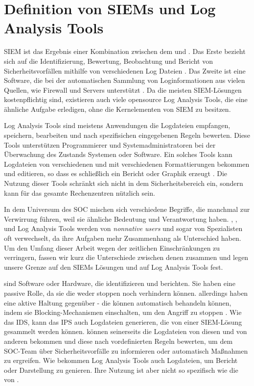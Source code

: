 \section{Definition von SIEMs und Log Analysis Tools}

\gls{SIEM} ist das Ergebnis einer Kombination zwischen dem  und  \citep{Dorigo_SIEM}. Das Erste bezieht sich auf die Identifizierung, Bewertung, Beobachtung und Bericht von Sicherheitsvorfällen mithilfe von verschiedenen Log Dateien \citep{techopedia_SEM}. Das Zweite ist eine Software, die bei der automatischen Sammlung von Loginformationen aus vielen Quellen, wie Firewall und Servers unterstützt \citep{techopedia_SIM}. Da die meisten \gls{SIEM}-Lösungen kostenpflichtig sind, existieren auch viele \gls{opensource} Log Analysis Tools, die eine ähnliche Aufgabe erledigen, ohne die Kernelementen von \gls{SIEM} zu besitzen. 

Log Analysis Tools sind meistens Anwendungen die Logdateien empfangen, speichern, bearbeiten und nach spezifisichen eingegebenen Regeln bewerten. Diese Tools unterstützen Programmierer und Systemadministratoren bei der Überwachung des Zustands Systemen oder Software. Ein solches Tools kann Logdateien von verschiedenen  und mit verschiedenen Formattierungen bekommen und editieren, so dass es schließlich ein Bericht oder Graphik erzeugt \citep{Korzeniowski_LATDef}. Die Nutzung dieser Tools schränkt sich nicht in dem Sicherheitsbereich ein, sondern kann für das gesamte Rechenzentren nützlich sein.


In dem Universum des \gls{SOC} mischen sich verschiedene Begriffe, die manchmal zur Verwirrung führen, weil sie ähnliche Bedeutung und Verantwortung haben. , ,  und Log Analysis Tools werden von \textit{nonnative users}  und sogar von Spezialisten oft verwechselt, da ihre Aufgaben mehr Zusammenhang als Unterschied haben. Um den Umfang dieser Arbeit wegen der zeitlichen Einschränkungen zu verringern, fassen wir kurz die Unterschiede zwischen denen zusammen und legen unsere Grenze auf den \glspl{SIEM} Lösungen und auf Log Analysis Tools fest. 

\newpage
{} sind Software oder Hardware, die  identifizieren und berichten. Sie haben eine passive Rolle, da sie die  weder stoppen noch verhindern können. allerdings haben eine aktive Haltung gegenüber  - die können automatisch behandeln können, indem sie Blocking-Mechanismen einschalten, um den Angriff zu stoppen \citep{Wendzel_IS}. Wie das \gls{IDS}, kann das \gls{IPS} auch Logdateien generieren, die von einer \gls{SIEM}-Lösung gesammelt werden können.  können seinerseits die Logdateien von diesen und von anderen  bekommen und diese nach vordefinierten Regeln bewerten, um dem \gls{SOC}-Team über Sicherheitsvorfälle zu informieren oder automatisch Maßnahmen zu ergreifen. Wie  bekommen Log Analysis Tools auch Logdateien, um Bericht oder Darstellung zu genieren. Ihre Nutzung ist aber nicht so spezifisch wie die von . 

